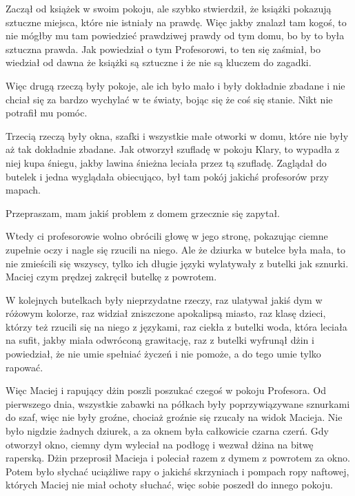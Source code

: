 Zaczął od książek w swoim pokoju, ale szybko stwierdził, że książki pokazują sztuczne miejsca, które nie istniały na prawdę. 
Więc jakby znalazł tam kogoś, to nie mógłby mu tam powiedzieć prawdziwej prawdy od tym domu, bo by to była sztuczna prawda. 
Jak powiedział o tym Profesorowi, to ten się zaśmiał, bo wiedział od dawna że książki są sztuczne i że nie są kluczem do zagadki. 

Więc drugą rzeczą były pokoje, ale ich było mało i były dokładnie zbadane i nie chciał się za bardzo wychylać w te światy, bojąc się że coś się stanie. Nikt nie potrafił mu pomóc.

Trzecią rzeczą były okna, szafki i wszystkie małe otworki w domu, które nie były aż tak dokładnie zbadane.
Jak otworzył szufladę w pokoju Klary, to wypadła z niej kupa śniegu, jakby lawina śnieżna leciała przez tą szufladę. Zaglądał do butelek i jedna wyglądała obiecująco, był tam pokój jakichś profesorów przy mapach.
\begin{dialogue}
	\ds{} Przepraszam, mam jakiś problem z domem \dm{} grzecznie się zapytał.
\end{dialogue}
Wtedy ci profesorowie wolno obrócili głowę w jego stronę, pokazując ciemne zupełnie oczy i nagle się rzucili na niego. Ale że dziurka w butelce była mała, to nie zmieścili się wszyscy, tylko ich długie języki wylatywały z butelki jak sznurki. Maciej czym prędzej zakręcił butelkę z powrotem.

W kolejnych butelkach były nieprzydatne rzeczy, raz ulatywał jakiś dym w różowym kolorze, raz widział zniszczone apokalipsą miasto, raz klasę dzieci, którzy też rzucili się na niego z językami, raz ciekła z butelki woda, która leciała na sufit, jakby miała odwróconą grawitację, raz z butelki wyfrunął dżin i powiedział, że nie umie spełniać życzeń i nie pomoże, a do tego umie tylko rapować.

Więc Maciej i rapujący dżin poszli poszukać czegoś w pokoju Profesora.
Od pierwszego dnia, wszystkie zabawki na półkach były poprzywiązywane sznurkami do szaf, więc nie były groźne, chociaż groźnie się rzucały na widok Macieja.
Nie było nigdzie żadnych dziurek, a za oknem była całkowicie czarna czerń.
Gdy otworzył okno, ciemny dym wyleciał na podłogę i wezwał dżina na bitwę raperską.
Dżin przeprosił Macieja i poleciał razem z dymem z powrotem za okno. Potem było słychać uciążliwe rapy o jakichś skrzyniach i pompach ropy naftowej, których Maciej nie miał ochoty słuchać, więc sobie poszedł do innego pokoju.

